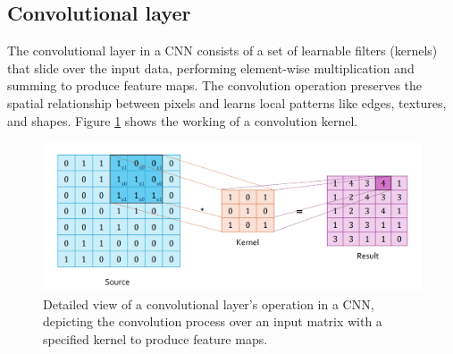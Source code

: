 \subsection{Convolutional layer}
The convolutional layer in a \gls{CNN} consists of a set of learnable filters (kernels) that slide over the input data, performing element-wise multiplication and summing to produce feature maps. The convolution operation preserves the spatial relationship between pixels and learns local patterns like edges, textures, and shapes. Figure \ref{fig:Conv1} shows the working of a convolution kernel. 
\begin{figure}[ht]
    \centeringflo
    \includegraphics[width=14cm]{images/Theory-DL/Conv1.png}
    \caption{Detailed view of a convolutional layer's operation in a CNN, depicting the convolution process over an input matrix with a specified kernel to produce feature maps.}
    \label{fig:Conv1}
  \end{figure}
